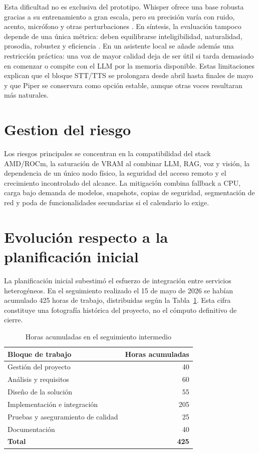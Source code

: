 Esta dificultad no es exclusiva del prototipo. Whisper ofrece una base robusta gracias a su entrenamiento a gran escala, pero su precisión varía con ruido, acento, micrófono y otras perturbaciones \citep{radford2023whisper,speechRobustBench2024}. En síntesis, la evaluación tampoco depende de una única métrica: deben equilibrarse inteligibilidad, naturalidad, prosodia, robustez y eficiencia \citep{tan2021neuraltts}. En un asistente local se añade además una restricción práctica: una voz de mayor calidad deja de ser útil si tarda demasiado en comenzar o compite con el LLM por la memoria disponible. Estas limitaciones explican que el bloque STT/TTS se prolongara desde abril hasta finales de mayo y que Piper se conservara como opción estable, aunque otras voces resultaran más naturales.

\section{Gestion del riesgo}
Los riesgos principales se concentran en la compatibilidad del stack AMD/ROCm, la saturación de VRAM al combinar LLM, RAG, voz y visión, la dependencia de un único nodo físico, la seguridad del acceso remoto y el crecimiento incontrolado del alcance. La mitigación combina fallback a CPU, carga bajo demanda de modelos, snapshots, copias de seguridad, segmentación de red y poda de funcionalidades secundarias si el calendario lo exige.

\section{Evolución respecto a la planificación inicial}
La planificación inicial subestimó el esfuerzo de integración entre servicios heterogéneos. En el seguimiento realizado el 15 de mayo de 2026 se habían acumulado 425 horas de trabajo, distribuidas según la Tabla~\ref{tab:horas-reales-intermedias}. Esta cifra constituye una fotografía histórica del proyecto, no el cómputo definitivo de cierre.

\begin{table}[H]
  \centering
  \caption{Horas acumuladas en el seguimiento intermedio}
  \label{tab:horas-reales-intermedias}
  \begin{tabular}{lr}
    \toprule
    Bloque de trabajo & Horas acumuladas \\
    \midrule
    Gestión del proyecto & 40 \\
    Análisis y requisitos & 60 \\
    Diseño de la solución & 55 \\
    Implementación e integración & 205 \\
    Pruebas y aseguramiento de calidad & 25 \\
    Documentación & 40 \\
    \midrule
    \textbf{Total} & \textbf{425} \\
    \bottomrule
  \end{tabular}
\end{table}

